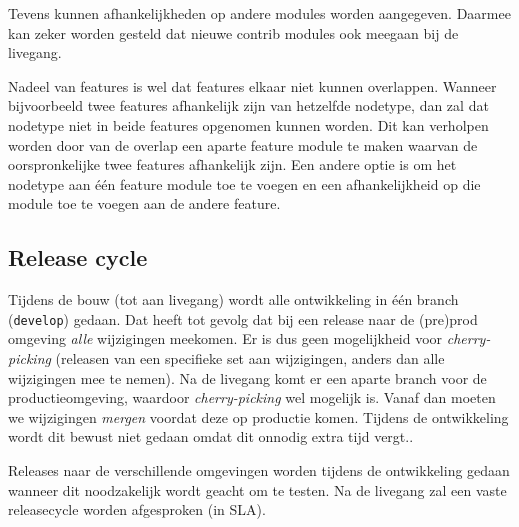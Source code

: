 Tevens kunnen afhankelijkheden op andere modules worden aangegeven. Daarmee kan zeker worden gesteld dat nieuwe contrib modules ook meegaan bij de livegang.

Nadeel van features is wel dat features elkaar niet kunnen overlappen. Wanneer bijvoorbeeld twee features afhankelijk zijn van hetzelfde nodetype, dan zal dat nodetype niet in beide features opgenomen kunnen worden. Dit kan verholpen worden door van de overlap een aparte feature module te maken waarvan de oorspronkelijke twee features afhankelijk zijn. Een andere optie is om het nodetype aan \'{e}\'{e}n feature module toe te voegen en een afhankelijkheid op die module toe te voegen aan de andere feature.

\subsection{Release cycle}

Tijdens de bouw (tot aan livegang) wordt alle ontwikkeling in \'{e}\'{e}n branch (\texttt{develop}) gedaan. Dat heeft tot gevolg dat bij een release naar de (pre)prod omgeving \emph{alle} wijzigingen meekomen. Er is dus geen mogelijkheid voor \emph{cherry-picking} (releasen van een specifieke set aan wijzigingen, anders dan alle wijzigingen mee te nemen).
Na de livegang komt er een aparte branch voor de productieomgeving, waardoor \emph{cherry-picking} wel mogelijk is. Vanaf dan moeten we wijzigingen \emph{mergen} voordat deze op productie komen. Tijdens de ontwikkeling wordt dit bewust niet gedaan omdat dit onnodig extra tijd vergt..

Releases naar de verschillende omgevingen worden tijdens de ontwikkeling gedaan wanneer dit noodzakelijk wordt geacht om te testen. Na de livegang zal een vaste releasecycle worden afgesproken (in SLA).


